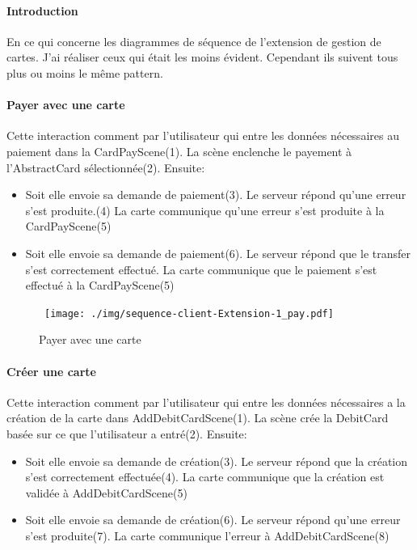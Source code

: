 \documentclass{article}
\begin{document}
\paragraph{Introduction}
En ce qui concerne les diagrammes de séquence de l'extension de gestion de cartes. J'ai réaliser
ceux qui était les moins évident. Cependant ils suivent tous plus ou moins le même pattern.

\paragraph{Payer avec une carte}

Cette interaction comment par l'utilisateur qui entre les données nécessaires au paiement
dans la CardPayScene(1). La scène enclenche le payement à l'AbstractCard sélectionnée(2).
\newline
Ensuite:
\begin{itemize}
    \item Soit elle envoie sa demande de paiement(3). Le serveur répond qu'une erreur s'est produite.(4)
    La carte communique qu'une erreur s'est produite à la CardPayScene(5)
    \item Soit elle envoie sa demande de paiement(6). Le serveur répond que le transfer s'est correctement
        effectué. La carte communique que le paiement s'est effectué à la CardPayScene(5)
\end{itemize}
 


\begin{figure}[h!]
    \hbox{
        \centering\texttt{[image: ./img/sequence-client-Extension-1\_pay.pdf]}
    }
    \caption{Payer avec une carte}
\end{figure}

\newpage

\paragraph{Créer une carte}

Cette interaction comment par l'utilisateur qui entre les données nécessaires a la création
de la carte dans AddDebitCardScene(1). La scène crée la DebitCard basée sur ce que l'utilisateur
a entré(2).
\newline
Ensuite:
\begin{itemize}
    \item Soit elle envoie sa demande de création(3). Le serveur répond que la création s'est correctement
    effectuée(4). La carte communique que la création est validée à AddDebitCardScene(5)
    \item Soit elle envoie sa demande de création(6). Le serveur répond qu'une erreur s'est produite(7).
     La carte communique l'erreur à AddDebitCardScene(8)
\end{itemize}
\end{document}
